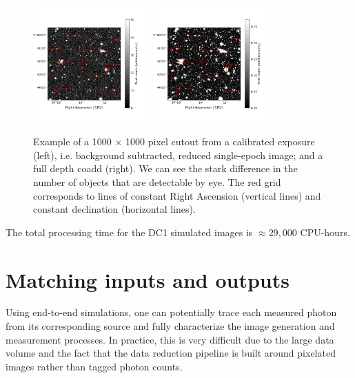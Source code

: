 \documentclass[\docopts]{\docclass}
\begin{document}
\begin{figure}
\centering
\includegraphics[width=0.4\textwidth]{calexp_example.png}
\includegraphics[width=0.4\textwidth]{coadd_example.png}
\caption{Example of a 1000 $\times$ 1000 pixel cutout from a calibrated exposure (left), i.e. background subtracted, reduced single-epoch image; and a full depth coadd (right). We can see the stark difference in the number of objects that are detectable by eye. The red grid corresponds to lines of constant Right Ascension (vertical lines) and constant declination (horizontal lines).}
\label{fig:coadd_example}
\end{figure}

The total processing time for the DC1 simulated images is $\approx 29,000$ CPU-hours.

\section{Matching inputs and outputs}
\label{sec:matching}

Using end-to-end simulations, one can potentially trace each measured photon from its corresponding source and fully characterize the image generation and measurement processes. In practice, this is very difficult due to the large data volume and the fact that the data reduction pipeline is built around pixelated images rather than tagged photon counts.
\end{document}
